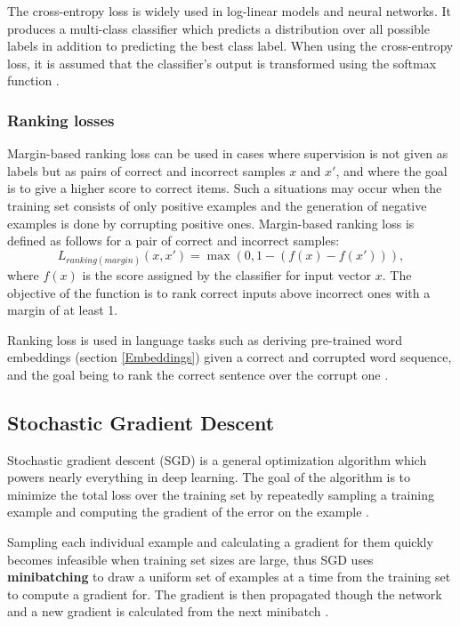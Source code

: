 The cross-entropy loss is widely used in log-linear models and neural networks.
It produces a multi-class classifier which predicts a distribution over all possible labels in addition to predicting the best class label.
When using the cross-entropy loss, it is assumed that the classifier’s output is transformed using the softmax function \cite{goldberg2017}.



\subsubsection{Ranking losses}\label{Ranking losses}
Margin-based ranking loss can be used in cases where supervision is not given as labels but as pairs of correct and incorrect samples $x$ and $x'$, and where the goal is to give a higher score to correct items.
Such a situations may occur when the training set consists of only positive examples and the generation of negative examples is done by corrupting positive ones.
Margin-based ranking loss is defined as follows for a pair of correct and incorrect samples:
\begin{equation}
  L_{ranking(margin)}(x,x')=\max(0, 1 - (f(x) - f(x'))),
\end{equation}
where $f(x)$ is the score assigned by the classifier for input vector $x$.
The objective of the function is to rank correct inputs above incorrect ones with a margin of at least 1.

Ranking loss is used in language tasks such as deriving pre-trained word embeddings (section \ref{Embeddings}) given a correct and corrupted word sequence, and the goal being to rank the correct sentence over the corrupt one \cite{goldberg2017}.


\subsection{Stochastic Gradient Descent}

Stochastic gradient descent (SGD) is a general optimization algorithm which powers nearly everything in deep learning.
The goal of the algorithm is to minimize the total loss over the training set by repeatedly sampling a training example and computing the gradient of the error on the example \cite{goldberg2017}.

Sampling each individual example and calculating a gradient for them quickly becomes infeasible when training set sizes are large, thus SGD uses \textbf{minibatching} to draw a uniform set of examples at a time from the training set to compute a gradient for.
The gradient is then propagated though the network and a new gradient is calculated from the next minibatch \cite{goodfellow2016}.

